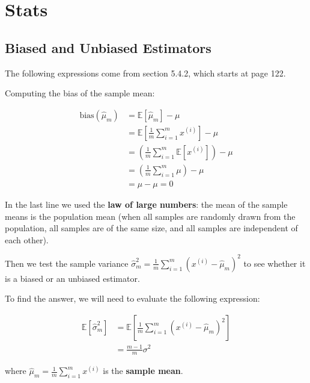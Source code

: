 \chapter{Stats}

\section{Biased and Unbiased Estimators}

The following expressions come from \cite{Goodfellow-et-al-2016} section 5.4.2, 
which starts at page 122.

Computing the bias of the sample mean:

\begin{align*}
\text{bias}(\hat{\mu}_m) &= \mathbb{E}\left[\hat{\mu}_m\right] - \mu \\
&= \mathbb{E} \left[ \frac{1}{m} \sum_{i=1}^{m} x^{(i)} \right] - \mu \\
&= \left( \frac{1}{m} \sum_{i=1}^{m} \mathbb{E}\left[ x^{(i)} \right] \right) - \mu\\
&= \left( \frac{1}{m} \sum_{i=1}^{m} \mu \right) - \mu \\
&= \mu - \mu = 0
\end{align*}

In the last line we used the \textbf{law of large numbers}:
the mean of the sample means is the population mean (when all samples are randomly drawn from the
population, all samples are of the same size, and all samples are independent of each other).

Then we test the sample variance
$\hat{\sigma}^{2}_{m} = \frac{1}{m} \sum_{i=1}^{m} \left( x^{(i)} - \hat{\mu}_m \right)^2$
to see whether it is a biased or an unbiased estimator.

To find the answer, we will need to evaluate the following expression:

\begin{align} \label{stats:biased-variance-estimator}
\mathbb{E}\left[ \hat{\sigma}^{2}_{m} \right] 
    &= \mathbb{E} \left[ \frac{1}{m} \sum_{i=1}^{m} \left( x^{(i)} - \hat{\mu}_m \right)^2 \right] \\
&= \frac{m-1}{m} \sigma^2
\end{align}

where $\hat{\mu}_m = \frac{1}{m} \sum_{i=1}^{m} x^{(i)}$ is the \textbf{sample mean}.
 


